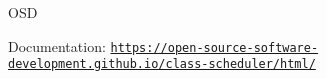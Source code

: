 O\-S\-D

Documentation\-: \href{https://open-source-software-development.github.io/class-scheduler/html/}{\tt https\-://open-\/source-\/software-\/development.\-github.\-io/class-\/scheduler/html/} 